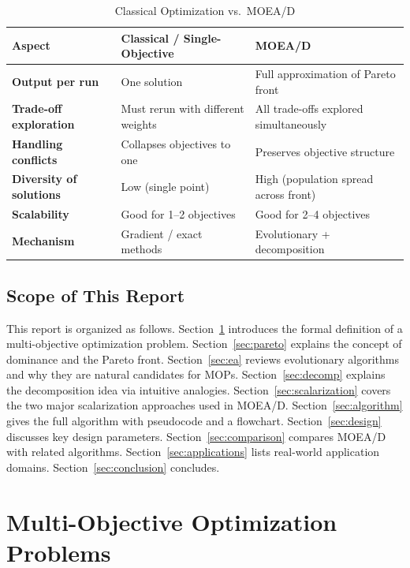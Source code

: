 \documentclass[12pt,a4paper]{article}
\begin{document}
\begin{table}[H]
\centering
\caption{Classical Optimization vs.\ MOEA/D}
\label{tab:classical_vs_moead}
\renewcommand{\arraystretch}{1.4}
\begin{tabular}{>{\bfseries}p{4cm} p{5cm} p{5cm}}
\toprule
\textbf{Aspect} & \textbf{Classical / Single-Objective} & \textbf{MOEA/D} \\
\midrule
Output per run & One solution & Full approximation of Pareto front \\
Trade-off exploration & Must rerun with different weights & All trade-offs explored simultaneously \\
Handling conflicts & Collapses objectives to one & Preserves objective structure \\
Diversity of solutions & Low (single point) & High (population spread across front) \\
Scalability & Good for 1--2 objectives & Good for 2--4 objectives \\
Mechanism & Gradient / exact methods & Evolutionary + decomposition \\
\bottomrule
\end{tabular}
\end{table}

\subsection{Scope of This Report}

This report is organized as follows. Section~\ref{sec:mop} introduces the formal definition of a multi-objective optimization problem. Section~\ref{sec:pareto} explains the concept of dominance and the Pareto front. Section~\ref{sec:ea} reviews evolutionary algorithms and why they are natural candidates for MOPs. Section~\ref{sec:decomp} explains the decomposition idea via intuitive analogies. Section~\ref{sec:scalarization} covers the two major scalarization approaches used in MOEA/D. Section~\ref{sec:algorithm} gives the full algorithm with pseudocode and a flowchart. Section~\ref{sec:design} discusses key design parameters. Section~\ref{sec:comparison} compares MOEA/D with related algorithms. Section~\ref{sec:applications} lists real-world application domains. Section~\ref{sec:conclusion} concludes.

\section{Multi-Objective Optimization Problems}
\label{sec:mop}
\end{document}
